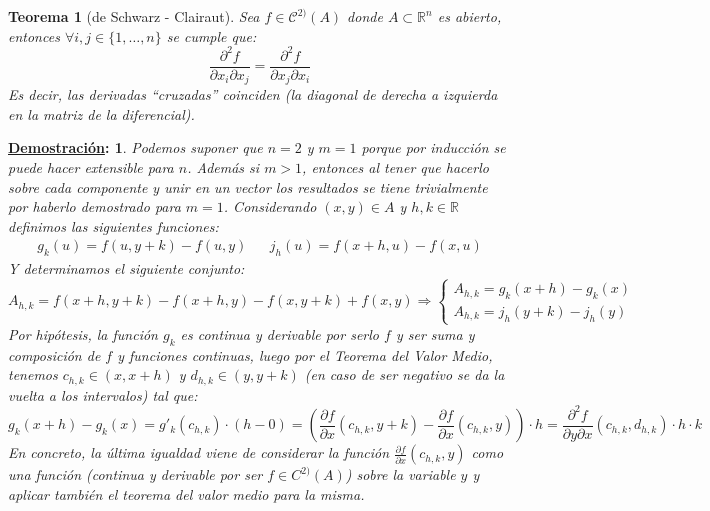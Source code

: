 \documentclass[10pt,a4paper,openright]{book}
\theoremstyle{break}
\newtheorem*{theo}{Teorema}
\newtheorem*{demo}{\underline{Demostración}:}
\begin{document}
\begin{theo}[de Schwarz - Clairaut]
Sea $f \in \mathcal{C}^{2)} (A)$ donde $A \subset \mathbb{R}^n$ es abierto, entonces $\forall i,j \in \{1, \ldots, n\}$ se cumple que: 
$$\frac{\partial^2 f}{\partial x_i \partial x_j} = \frac{\partial^2 f}{\partial x_j \partial x_i}$$
Es decir, las derivadas ``cruzadas'' coinciden (la diagonal de derecha a izquierda en la matriz de la diferencial).
\end{theo}
\begin{demo}
Podemos suponer que $n = 2$ y $m = 1$ porque por inducción se puede hacer extensible para $n$. Además si $m> 1$, entonces al tener que hacerlo sobre cada componente y unir en un vector los resultados se tiene trivialmente por haberlo demostrado para $m=1$. Considerando $(x,y)\in A$ y $h,k\in \mathbb R$ definimos las siguientes funciones:
\begin{align*}
g_k(u)=f(u,y+k)-f(u, y) && j_h(u) = f(x +h,u) - f(x, u)
\end{align*}
Y determinamos el siguiente conjunto:
$$A_{h,k} = f(x+h, y+k) - f(x+h, y) - f(x,y+k) + f(x,y) \Rightarrow \begin{cases} A_{h,k} = g_k(x+h) - g_k (x) \\ A_{h,k} = j_{h}(y+k) - j_h(y) \end{cases}$$
Por hipótesis, la función $g_k$ es continua y derivable por serlo $f$ y ser suma y composición de $f$ y funciones continuas, luego por el Teorema del Valor Medio, tenemos $c_{h,k}\in (x, x+h)$ y $d_{h,k}\in (y, y+k)$ (en caso de ser negativo se da la vuelta a los intervalos) tal que:
$$g_k(x+h) - g_k (x) = g'_k(c_{h,k}) \cdot (h-0) = \left( \frac{\partial f}{\partial x}\left(c_{h,k}, y+k\right) - \frac{\partial f}{\partial x}\left(c_{h,k}, y\right)\right) \cdot h = \frac{\partial^{2}f}{\partial y \partial x}\left(c_{h,k}, d_{h,k}\right) \cdot h \cdot k$$
En concreto, la última igualdad viene de considerar la función $\frac{\partial f}{\partial x}(c_{h,k}, y)$ como una función (continua y derivable por ser $f\in C^{2)}(A)$) sobre la variable $y$ y aplicar también el teorema del valor medio para la misma.


\end{demo}
\end{document}
